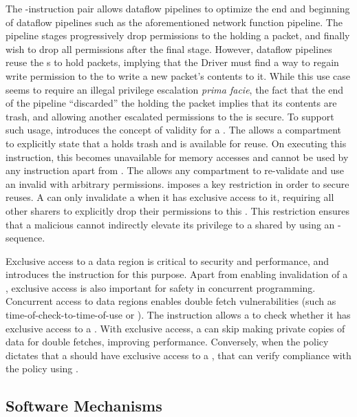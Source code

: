 The \scinval-\screval instruction pair allows dataflow pipelines
to optimize the end and beginning of dataflow pipelines
such as the aforementioned network function pipeline.
The pipeline stages progressively drop permissions to the \cell
holding a packet, and finally wish to drop all permissions after the 
final stage.
However, dataflow pipelines reuse the \cell{}s to hold packets,
implying that the Driver \secdiv must find a way to regain
write permission to the \cell to write a new packet's contents
to it.
While this use case seems to require an illegal privilege escalation 
\textit{prima facie}, the fact that the end of the pipeline ``discarded''
the \cell holding the packet implies that its contents are trash,
and allowing another \secdiv escalated permissions to the \cell
is secure.
To support such usage, \seccells introduces the concept of validity
for a \cell.
The \scinval allows a compartment to explicitly state that a
\cell holds trash and is available for reuse.
On executing this instruction, this \cell becomes unavailable for
memory accesses and cannot be used by any instruction apart from
\screval.
The \screval allows any compartment to re-validate and use an
invalid \cell with arbitrary permissions.
\seccells imposes a key restriction in order to secure \cell reuses.
A \secdiv can only invalidate a \cell when it has exclusive access
to it, requiring all other sharers to explicitly drop their
permissions to this \cell.
This restriction ensures that a malicious \secdiv cannot indirectly elevate its 
privilege to a shared \cell by using an \scinval-\screval sequence.

Exclusive access to a data region is critical to security and
performance, and \seccells introduces the \scexcl instruction for this 
purpose.
Apart from enabling invalidation of a \cell, exclusive access is also
important for safety in concurrent programming.
Concurrent access to data regions enables double fetch vulnerabilities
(such as time-of-check-to-time-of-use or \tocttou).
The \scexcl instruction allows a \secdiv to check whether it has
exclusive access to a \cell.
With exclusive access, a \secdiv can skip making private copies
of data for double fetches, improving performance.
Conversely, when the policy dictates that a \secdiv should have
exclusive access to a \cell, that \secdiv can verify compliance with
the policy using \scexcl.

\subsection{Software Mechanisms}
\label{sec:seccells:design:softmech}

